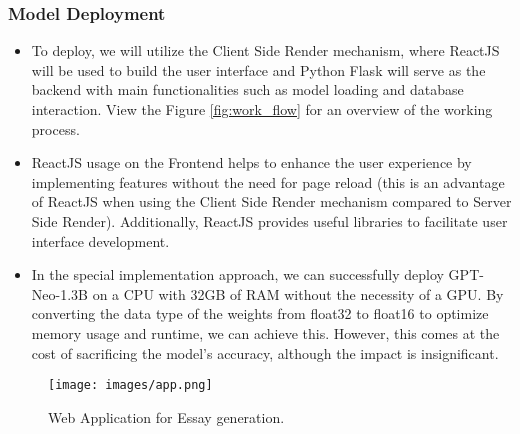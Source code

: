 \documentclass[conference]{IEEEtran}
\begin{document}
\subsubsection{Model Deployment}\label{SCM}
    \begin{itemize}
        \item To deploy, we will utilize the Client Side Render mechanism, where ReactJS will be used to build the user interface and Python Flask will serve as the backend with main functionalities such as model loading and database interaction. View the Figure \ref{fig:work_flow} for an overview of the working process.
        
        \item ReactJS usage on the Frontend helps to enhance the user experience by implementing features without the need for page reload (this is an advantage of ReactJS when using the Client Side Render mechanism compared to Server Side Render). Additionally, ReactJS provides useful libraries to facilitate user interface development. \\

        \item  In the special implementation approach, we can successfully deploy GPT-Neo-1.3B on a CPU with 32GB of RAM without the necessity of a GPU. By converting the data type of the weights from float32 to float16 to optimize memory usage and runtime, we can achieve this. However, this comes at the cost of sacrificing the model's accuracy, although the impact is insignificant.
    \end{itemize}

    \begin{figure}[ht]
        \centerline{\texttt{[image: images/app.png]}}
        \caption{Web Application for Essay generation.}
        \label{fig:web_application}
    \end{figure}

    


\end{document}
